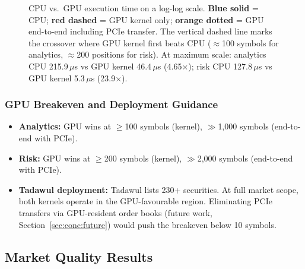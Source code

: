 \documentclass[12pt]{article}
\begin{document}
\begin{figure}[H]
\begin{subfigure}[t]{0.48\linewidth}
\end{subfigure}

\caption{CPU vs.\ GPU execution time on a log-log scale.
  \textbf{Blue solid} = CPU; \textbf{red dashed} = GPU kernel only;
  \textbf{orange dotted} = GPU end-to-end including PCIe transfer.
  The vertical dashed line marks the crossover where GPU kernel
  first beats CPU ($\approx$100 symbols for analytics,
  $\approx$200 positions for risk).
  At maximum scale: analytics CPU 215.9\,$\mu$s vs GPU kernel
  46.4\,$\mu$s (4.65$\times$); risk CPU 127.8\,$\mu$s vs GPU
  kernel 5.3\,$\mu$s (23.9$\times$).}
\label{fig:cpu_gpu_time}
\end{figure}

\subsubsection*{GPU Breakeven and Deployment Guidance}

\begin{itemize}
  \item \textbf{Analytics:} GPU wins at $\geq$100 symbols (kernel),
        $\gg$1,000 symbols (end-to-end with PCIe).
  \item \textbf{Risk:} GPU wins at $\geq$200 symbols (kernel),
        $\gg$2,000 symbols (end-to-end with PCIe).
  \item \textbf{Tadawul deployment:} Tadawul lists 230+ securities.
        At full market scope, both kernels operate in the GPU-favourable
        region. Eliminating PCIe transfers via GPU-resident order books
        (future work, Section~\ref{sec:conc:future}) would push the
        breakeven below 10 symbols.
\end{itemize}

\subsection{Market Quality Results}
\label{sec:eval:market}
\end{document}
